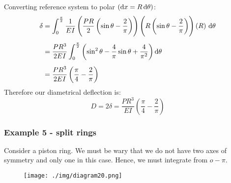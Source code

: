 Converting reference system to polar $\left(\dif x = R \dif \theta\right)$:
\begin{align}
  \delta & = \int_0^{\frac{\pi}{2}} \frac{1}{EI} \left(\frac{PR}{2}\left(\sin\theta - \frac{2}{\pi}\right)\right) \left(R\left(\sin\theta-\frac{2}{\pi}\right)\right) \left(R\right)\, \dif \theta \\[5pt]
         & = \frac{PR^3}{2EI} \int_0^{\frac{\pi}{2}} \left(\sin^2\theta - \frac{4}{\pi}\sin\theta + \frac{4}{\pi^2}\right)\dif \theta                                                              \\[5pt]
         & = \frac{PR^3}{2EI}\left(\frac{\pi}{4}-\frac{2}{\pi}\right)
\end{align}
Therefore our diametrical deflection is:
\begin{equation}
  D = 2\delta = \frac{PR^3}{EI}\left(\frac{\pi}{4}-\frac{2}{\pi}\right)
\end{equation}
\subsubsection{Example 5 - split rings}
Consider a piston ring. We must be wary that we do not have two axes of symmetry and only one in this case. Hence, we must integrate from $o-\pi$.
\begin{figure}[H]
  \centering
  \texttt{[image: ./img/diagram20.png]}
  \caption{}
\end{figure}
